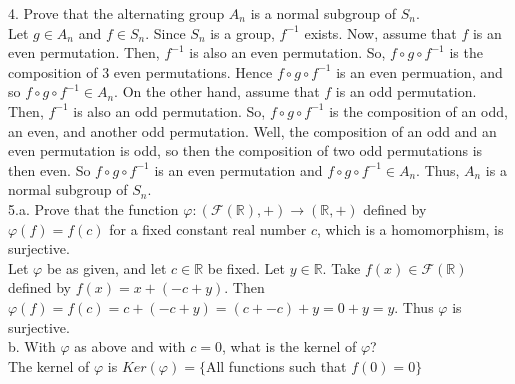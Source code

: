 \documentclass[12pt]{article}
\begin{document}
4. Prove that the alternating group $A_n$ is a normal subgroup of $S_n$.\\
Let $g\in A_n$ and $f\in S_n$. Since $S_n$ is a group, $f^{-1}$ exists. Now, assume that $f$ is an even permutation. Then, $f^{-1}$ is also an even permutation. So, $f\circ g\circ f^{-1}$ is the composition of 3 even permutations. Hence $f\circ g\circ f^{-1}$ is an even permuation, and so $f\circ g\circ f^{-1}\in A_n$. On the other hand, assume that $f$ is an odd permutation. Then, $f^{-1}$ is also an odd permutation. So, $f\circ g\circ f^{-1}$ is the composition of an odd, an even, and another odd permutation. Well, the composition of an odd and an even permutation is odd, so then the composition of two odd permutations is then even. So $f\circ g\circ f^{-1}$ is an even permutation and $f\circ g\circ f^{-1}\in A_n$. Thus, $A_n$ is a normal subgroup of $S_n$.\\[20pt]

5.a. Prove that the function $\varphi:(\mathcal{F}(\mathbb{R}),+)\rightarrow(\mathbb{R},+)$ defined by $\varphi(f)=f(c)$ for a fixed constant real number $c$, which is a homomorphism, is surjective.\\
Let $\varphi$ be as given, and let $c\in\mathbb{R}$ be fixed. Let $y\in\mathbb{R}$. Take $f(x)\in\mathcal{F}(\mathbb{R})$ defined by $f(x)=x+(-c+y)$. Then $\varphi(f)=f(c)=c+(-c+y)=(c+-c)+y=0+y=y$. Thus $\varphi$ is surjective.\\
b. With $\varphi$ as above and with $c=0$, what is the kernel of $\varphi$?\\ 
The kernel of $\varphi$ is $Ker(\varphi)=\{$All functions such that $f(0)=0\}$
\end{document}

